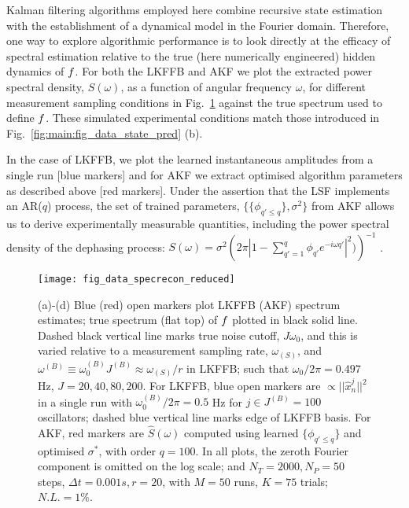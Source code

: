Kalman filtering algorithms employed here combine recursive state estimation with the establishment of a dynamical model in the Fourier domain.  Therefore, one way to explore algorithmic performance is to look directly at the efficacy of spectral estimation relative to the true (here numerically engineered) hidden dynamics of $f$.  For both the LKFFB and AKF we plot the extracted power spectral density, $S(\omega)$, as a function of angular frequency $\omega$, for different measurement sampling conditions in Fig.~\ref{fig:main:fig_data_specrecon} against the true spectrum used to define $f$.  These simulated experimental conditions match those introduced in Fig.~\ref{fig:main:fig_data_state_pred} (b). 

In the case of LKFFB, we plot the learned instantaneous amplitudes from a single run [blue markers] and for AKF we extract optimised algorithm parameters as described above [red markers]. Under the assertion that the LSF implements an AR($q$) process, the set of trained parameters, $\{  \{\phi_{q' \leq q}\}, \sigma^2\}$ from AKF allows us to derive experimentally measurable quantities, including the power spectral density of the dephasing process: $S(\omega) = \sigma^2 \left(2 \pi |1 - \sum_{q'=1}^q \phi_{q'} e^{-i\omega q'}|^2)\right)^{-1} $ \cite{brockwell1996introduction}.  

\begin{figure}[tp]
	\texttt{[image: fig\_data\_specrecon\_reduced]}
	\caption{\label{fig:main:fig_data_specrecon} (a)-(d) Blue (red) open markers plot LKFFB (AKF) spectrum estimates; true spectrum (flat top) of $f$ plotted in black solid line. Dashed black vertical line marks true noise cutoff, $J\omega_0$, and this is varied relative to a measurement sampling rate, $\omega_{(S)}$, and $\omega^{(B)}\equiv \omega_0^{(B)} J^{(B)} \approx \omega_{(S)}/r $ in LKFFB; such that $\omega_0 / 2\pi = 0.497$ Hz, $J = 20, 40, 80, 200$. For LKFFB, blue open markers are $\propto ||\hat{x}^j_n||^2 $ in a single run with $\omega_0^{(B)} / 2\pi = 0.5$ Hz for $j \in J^{(B)} = 100$ oscillators; dashed blue vertical line marks edge of LKFFB basis. For AKF,  red markers are $\hat{S}(\omega)$ computed using learned $\{\phi_{q' \leq q}\}$ and optimised $\sigma^*$, with order $q = 100$.  In all plots, the zeroth Fourier component is omitted on the log scale; and $N_T = 2000, N_P = 50$ steps, $\Delta t = 0.001s, r=20$, with $M=50$ runs, $K=75$ trials; $N.L. = 1\%$.} 
\end{figure} 

